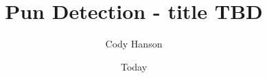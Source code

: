 \documentclass[]{article}
\begin{document}
\title{Pun Detection - title TBD}
\author{Cody Hanson}
\date{Today}
\maketitle





{}

\end{document}
